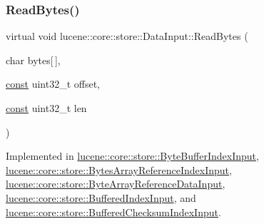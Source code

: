 \subsubsection{\texorpdfstring{Read\+Bytes()}{ReadBytes()}\hspace{0.1cm}{\footnotesize\ttfamily [1/2]}}
{\footnotesize\ttfamily virtual void lucene\+::core\+::store\+::\+Data\+Input\+::\+Read\+Bytes (\begin{DoxyParamCaption}\item[{char}]{bytes\mbox{[}$\,$\mbox{]},  }\item[{\mbox{\hyperlink{ZlibCrc32_8h_a2c212835823e3c54a8ab6d95c652660e}{const}} uint32\+\_\+t}]{offset,  }\item[{\mbox{\hyperlink{ZlibCrc32_8h_a2c212835823e3c54a8ab6d95c652660e}{const}} uint32\+\_\+t}]{len }\end{DoxyParamCaption})\hspace{0.3cm}{\ttfamily [pure virtual]}}



Implemented in \mbox{\hyperlink{classlucene_1_1core_1_1store_1_1ByteBufferIndexInput_abb72a44fc806fafc529b92d953b0007b}{lucene\+::core\+::store\+::\+Byte\+Buffer\+Index\+Input}}, \mbox{\hyperlink{classlucene_1_1core_1_1store_1_1BytesArrayReferenceIndexInput_a944168ab1d79ae43706bbf333f4dea56}{lucene\+::core\+::store\+::\+Bytes\+Array\+Reference\+Index\+Input}}, \mbox{\hyperlink{classlucene_1_1core_1_1store_1_1ByteArrayReferenceDataInput_ac0630806e8d4c3468b9531e16b00291c}{lucene\+::core\+::store\+::\+Byte\+Array\+Reference\+Data\+Input}}, \mbox{\hyperlink{classlucene_1_1core_1_1store_1_1BufferedIndexInput_ac762d844af38d0b8835f66af3ba46c4c}{lucene\+::core\+::store\+::\+Buffered\+Index\+Input}}, and \mbox{\hyperlink{classlucene_1_1core_1_1store_1_1BufferedChecksumIndexInput_a99c8cadcd9bdde48bd22144bc1829baf}{lucene\+::core\+::store\+::\+Buffered\+Checksum\+Index\+Input}}.

\mbox{\label{classlucene_1_1core_1_1store_1_1DataInput_aa5e0f36d6de9b544300f0519040171ae}} 
